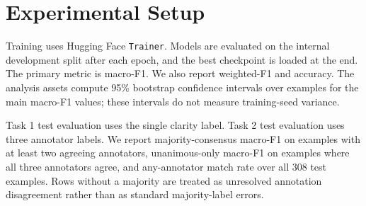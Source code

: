 \documentclass[11pt,twocolumn]{article}
\newcommand{\taskone}{Task 1}
\newcommand{\tasktwo}{Task 2}
\newcommand{\macroF}{macro-F1}
\begin{document}
\begin{table}[t]
\centering
\scriptsize
{}
\caption{Configuration summary for the saved runs. ``Accum.'' is gradient accumulation steps; train/eval batch sizes are per device.}
\label{tab:configs}
\end{table}

\section{Experimental Setup}

Training uses Hugging Face \texttt{Trainer}. Models are evaluated on the internal development split after each epoch, and the best checkpoint is loaded at the end. The primary metric is \macroF{}. We also report weighted-F1 and accuracy. The analysis assets compute 95\% bootstrap confidence intervals over examples for the main \macroF{} values; these intervals do not measure training-seed variance.

\taskone{} test evaluation uses the single clarity label. \tasktwo{} test evaluation uses three annotator labels. We report majority-consensus \macroF{} on examples with at least two agreeing annotators, unanimous-only \macroF{} on examples where all three annotators agree, and any-annotator match rate over all 308 test examples. Rows without a majority are treated as unresolved annotation disagreement rather than as standard majority-label errors.
\end{document}
